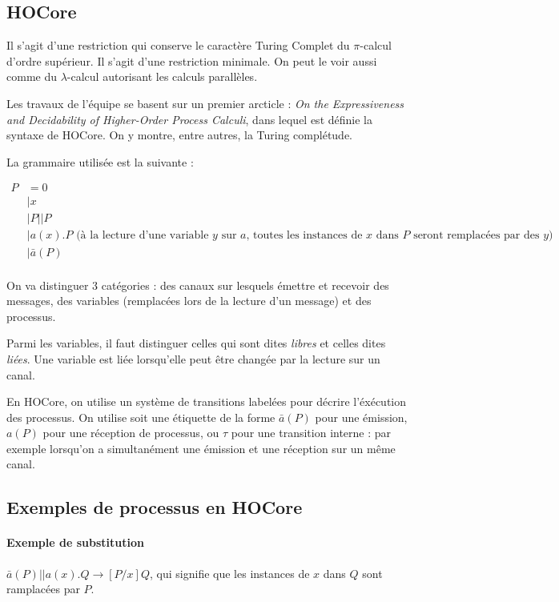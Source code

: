 \documentclass[11pt]{article}
\def\pic{$\pi$-calcul }
\begin{document}
\subsection{HOCore}
Il s'agit d'une restriction qui conserve le caractère Turing Complet du \pic d'ordre supérieur. Il s'agit d'une restriction minimale. On peut le voir aussi comme du $\lambda$-calcul autorisant les calculs parallèles.

Les travaux de l'équipe se basent sur un premier arcticle : \textit{On the Expressiveness and Decidability of Higher-Order Process Calculi}, dans lequel est définie la syntaxe de HOCore. On y montre, entre autres, la Turing complétude.

La grammaire utilisée est la suivante :

\begin{align*}
P &= 0 \\
&| x \\
&| P||P\\
&| a(x).P \text{ (à la lecture d'une variable $y$ sur $a$, toutes les instances de $x$ dans $P$ seront remplacées par des $y$)}\\
&| \bar{a}(P) \\
\end{align*}

On va distinguer 3 catégories : des canaux sur lesquels émettre et recevoir des messages, des variables (remplacées lors de la lecture d'un message) et des processus.

Parmi les variables, il faut distinguer celles qui sont dites \textit{libres} et celles dites \textit{liées}.
Une variable est liée lorsqu'elle peut être changée par la lecture sur un canal. 

En HOCore, on utilise un système de transitions labelées pour décrire l'éxécution des processus. On utilise soit une étiquette de la forme $\bar{a}(P)$ pour une émission, $a(P)$ pour une réception de processus, ou $\tau$ pour une transition interne : par exemple lorsqu'on a simultanément une émission et une réception sur un même canal.


\subsection{Exemples de processus en HOCore}
\paragraph{Exemple de substitution} $\bar{a}(P)||a(x).Q \rightarrow [P/x]Q$, qui signifie que les instances de $x$ dans $Q$ sont ramplacées par $P$.
\end{document}
